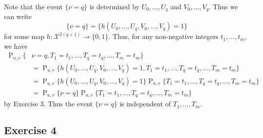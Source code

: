 \documentclass[12pt]{article}
\DeclareMathOperator{\Prob}{P}
\begin{document}
Note that the event $\{\nu = q\}$ is determined by $U_0, \ldots, U_q$ and $V_0, \ldots, V_q$. Thus we can write
\begin{equation*}
\{\nu = q\} = \{h(U_0, \ldots, U_q, V_0, \ldots, V_q) = 1\}
\end{equation*}
for some map $h : \mathcal{X}^{2(q+1)} \to \{0, 1\}$. Thus, for any non-negative integers $t_1, \ldots, t_m$, we have
\begin{align*}
\Prob_{u, v}\{&\nu = q, T_1 = t_1, \ldots, T_q = t_q, \ldots, T_m = t_m\} \\
&= \Prob_{u, v}\{h(U_0, \ldots, U_q, V_0, \ldots, V_q) = 1, T_1 = t_1, \ldots, T_q = t_q, \ldots, T_m = t_m\} \\
&= \Prob_{u, v}\{h(U_0, \ldots, U_q, V_0, \ldots, V_q) = 1\} \Prob_{u, v}\{T_1 = t_1, \ldots, T_q = t_q, \ldots, T_m = t_m\} \\
&= \Prob_{u, v}\{\nu = q\} \Prob_{u, v}\{T_1 = t_1, \ldots, T_q = t_q, \ldots, T_m = t_m\}
\end{align*}
by Exercise 3. Thus the event $\{\nu = q\}$ is independent of $T_1, \ldots, T_m$.

\subsection*{Exercise 4}
\end{document}
